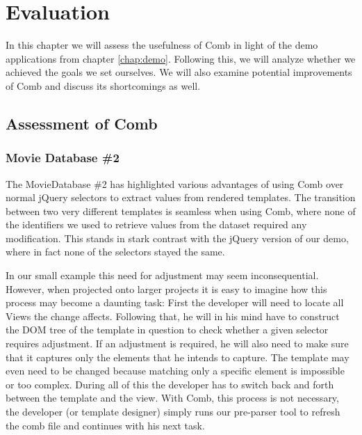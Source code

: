 \documentclass[thesis.tex]{subfiles}
\begin{document}
\chapter{Evaluation}
\label{chap:evaluation}


In this chapter we will assess the usefulness of Comb in light of the
demo applications from chapter \ref{chap:demo}.
Following this, we will analyze whether we achieved the goals we set ourselves.
We will also examine potential improvements of Comb and discuss its shortcomings
as well.




\section{Assessment of Comb}
\label{sec:assessment}

\subsection{Movie Database \#2}
\label{sec:asses-mdb}
The MovieDatabase \#2 has highlighted various advantages of using Comb over
normal jQuery selectors to extract values from rendered templates.
The transition between two very different templates is seamless when using Comb,
where none of the identifiers we used to retrieve values from the dataset
required any modification. This stands in stark contrast with the jQuery version
of our demo, where in fact none of the selectors stayed the same.

In our small example this need for adjustment may seem inconsequential.
However, when projected onto larger projects it is easy to imagine how this
process may become a daunting task: First the developer will need to locate all
Views the change affects. Following that, he will in his mind have to construct
the DOM tree of the template in question to check whether a given selector
requires adjustment.
If an adjustment is required, he will also need to make sure that
it captures only the elements that he intends to capture.
The template may even need to be changed because matching only a specific
element is impossible or too complex.
During all of this the developer has to switch back and forth between
the template and the view. With Comb, this process is not necessary, the
developer (or template designer) simply runs our pre-parser tool to refresh the
comb file and continues with his next task.
\end{document}
